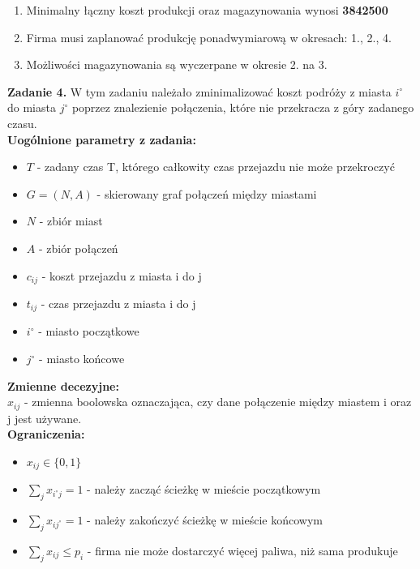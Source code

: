 \documentclass[15pt, a4paper]{article}
\begin{document}
\begin{enumerate}
    \item Minimalny łączny koszt produkcji oraz magazynowania wynosi \textbf{3842500}
    \item Firma musi zaplanować produkcję ponadwymiarową w okresach: 1., 2., 4.
    \item Możliwości magazynowania są wyczerpane w okresie 2. na 3.
\end{enumerate}

\vspace{0.5cm}

\noindent\hrulefill

\vspace{0.5cm}


\noindent\textbf{Zadanie 4.} W tym zadaniu należało zminimalizować koszt podróży z miasta \(i^\circ\) do miasta \(j^\circ\) poprzez znalezienie połączenia, które nie przekracza z góry zadanego czasu.\\

\noindent\textbf{Uogólnione parametry z zadania:}

\begin{itemize}
    \item \( T \) - zadany czas T, którego całkowity czas przejazdu nie może przekroczyć
    \item \( G = (N, A) \) - skierowany graf połączeń między miastami
    \item \( N \) - zbiór miast
    \item \( A \) - zbiór połączeń
    \item \( c_{ij} \) - koszt przejazdu z miasta i do j
    \item \( t_{ij} \) - czas przejazdu z miasta i do j
    \item \( i^\circ \) - miasto początkowe
    \item \( j^\circ \) - miasto końcowe 
\end{itemize} 

\noindent\textbf{Zmienne decezyjne:}\\

\noindent \(x_{ij}\) - zmienna boolowska oznaczająca, czy dane połączenie między miastem i oraz j jest używane.\\

\noindent\textbf{Ograniczenia:}

\begin{itemize}
    \item \(x_{ij} \in \{0, 1\} \)
    \item \(\sum_{j}x_{i^\circ j} = 1 \) - należy zacząć ścieżkę w mieście początkowym 
    \item \(\sum_{j}x_{ij^\circ} = 1 \) - należy zakończyć ścieżkę w mieście końcowym 
    \item \(\sum_{j}x_{ij} \leq p_i \) - firma nie może dostarczyć więcej paliwa, niż sama produkuje
\end{itemize}
\end{document}
